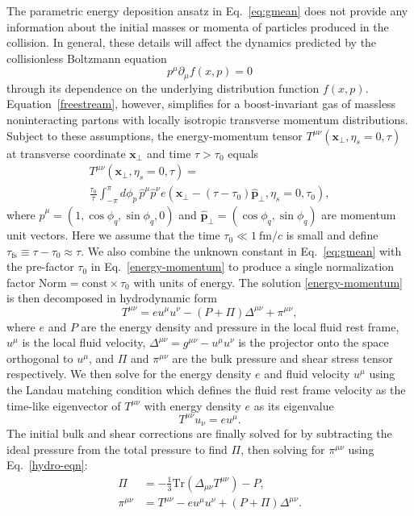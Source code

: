\documentclass[aps,prc,reprint,amsmath,nofootinbib]{revtex4-1}
\newcommand{\fmc}{\ensuremath{\text{fm}/c}}
\newcommand{\taufs}{\tau_\text{fs}}
\newcommand{\xv}{\mathbf x}
\begin{document}
The parametric energy deposition ansatz in Eq.~\eqref{eq:gmean} does not provide any information about the initial masses or momenta of particles produced in the collision.
In general, these details will affect the dynamics predicted by the collisionless Boltzmann equation
\begin{equation}
  \label{freestream}
  p^\mu \partial_\mu f(x, p) = 0
\end{equation}
through its dependence on the underlying distribution function $f(x, p)$.
Equation~\eqref{freestream}, however, simplifies for a boost-invariant gas of massless noninteracting partons with locally isotropic transverse momentum distributions.
Subject to these assumptions, the energy-momentum tensor $T^{\mu\nu}(\xv_\perp, \eta_s=0, \tau)$ at transverse coordinate $\xv_\perp$ and time $\tau > \tau_0$ equals \cite{Broniowski:2008qk, Liu:2015nwa}
\begin{multline}
  \label{energy-momentum}
  T^{\mu\nu}(\xv_\perp, \eta_s=0, \tau) =\\
  \frac{\tau_0}{\tau} \int_{-\pi}^{\pi} d\phi_p\, \hat{p}^\mu \hat{p}^\nu e(\xv_\perp - (\tau - \tau_0)\hat{\mathbf{p}}_\perp, \eta_s=0, \tau_0),
\end{multline}
where $\hat{p}^\mu = (1, \cos \phi_q, \sin \phi_q, 0)$ and $\hat{\mathbf{p}}_\perp = (\cos \phi_q, \sin \phi_q)$ are momentum unit vectors.
Here we assume that the time $\tau_0 \ll 1~\fmc$ is small and define $\taufs \equiv \tau - \tau_0 \approx \tau$.
We also combine the unknown constant in Eq.~\eqref{eq:gmean} with the pre-factor $\tau_0$ in Eq.~\eqref{energy-momentum} to produce a single normalization factor $\text{Norm} = \text{const} \times \tau_0$ with units of energy.
The solution \eqref{energy-momentum} is then decomposed in hydrodynamic form
\begin{equation}
  \label{hydro-eqn}
  T^{\mu\nu} = e u^\mu u^\nu - (P + \Pi) \Delta^{\mu\nu} + \pi^{\mu\nu},
\end{equation}
where $e$ and $P$ are the energy density and pressure in the local fluid rest frame, $u^\mu$ is the local fluid velocity, ${\Delta^{\mu\nu} = g^{\mu\nu} - u^\mu u^\nu}$ is the projector onto the space orthogonal to $u^\mu$, and $\Pi$ and $\pi^{\mu\nu}$ are the bulk pressure and shear stress tensor respectively.
We then solve for the energy density $e$ and fluid velocity $u^\mu$ using the Landau matching condition which defines the fluid rest frame velocity as the time-like eigenvector of $T^{\mu\nu}$ with energy density $e$ as its eigenvalue
\begin{equation}
  T^{\mu\nu} u_\nu = e u^\mu.
\end{equation}
The initial bulk and shear corrections are finally solved for by subtracting the ideal pressure from the total pressure to find $\Pi$, then solving for $\pi^{\mu\nu}$ using Eq.~\eqref{hydro-eqn}:
\begin{align}
  \Pi &= -\frac{1}{3} \mathrm{Tr}(\Delta_{\mu\nu} T^{\mu\nu}) - P,\\
  \pi^{\mu\nu} &= T^{\mu\nu} - e u^\mu u^\nu + (P + \Pi) \Delta^{\mu\nu}.
\end{align}
\end{document}
